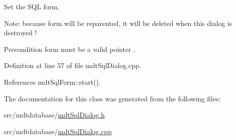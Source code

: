Set the S\-Q\-L form. 

Note\-: because form will be reparented, it will be deleted when this dialog is destroyed !

\begin{DoxyPrecond}{Precondition}
form must be a valid pointer . 
\end{DoxyPrecond}


Definition at line 57 of file mdt\-Sql\-Dialog.\-cpp.



References mdt\-Sql\-Form\-::start().



The documentation for this class was generated from the following files\-:\begin{DoxyCompactItemize}
\item 
src/mdtdatabase/\hyperlink{mdt_sql_dialog_8h}{mdt\-Sql\-Dialog.\-h}\item 
src/mdtdatabase/\hyperlink{mdt_sql_dialog_8cpp}{mdt\-Sql\-Dialog.\-cpp}\end{DoxyCompactItemize}
